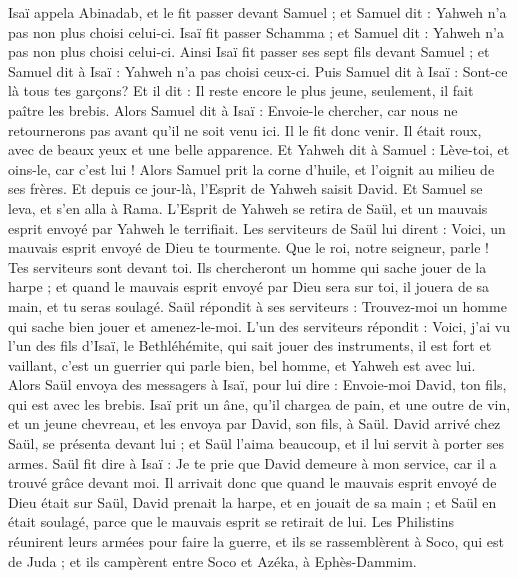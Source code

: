 \begin{multicols}{2}
Isaï appela Abinadab, et le fit passer devant Samuel ; et Samuel dit : Yahweh n'a pas non plus choisi celui-ci.
Isaï fit passer Schamma ; et Samuel dit : Yahweh n'a pas non plus choisi celui-ci.
Ainsi Isaï fit passer ses sept fils devant Samuel ; et Samuel dit à Isaï : Yahweh n'a pas choisi ceux-ci.
Puis Samuel dit à Isaï : Sont-ce là tous tes garçons? Et il dit : Il reste encore le plus jeune, seulement, il fait paître les brebis. Alors Samuel dit à Isaï : Envoie-le chercher, car nous ne retournerons pas avant qu'il ne soit venu ici.
Il le fit donc venir. Il était roux, avec de beaux yeux et une belle apparence. Et Yahweh dit à Samuel : Lève-toi, et oins-le, car c'est lui !
Alors Samuel prit la corne d'huile, et l'oignit au milieu de ses frères. Et depuis ce jour-là, l'Esprit de Yahweh saisit David. Et Samuel se leva, et s'en alla à Rama.
L'Esprit de Yahweh se retira de Saül, et un mauvais esprit envoyé par Yahweh le terrifiait.
Les serviteurs de Saül lui dirent : Voici, un mauvais esprit envoyé de Dieu te tourmente.
Que le roi, notre seigneur, parle ! Tes serviteurs sont devant toi. Ils chercheront un homme qui sache jouer de la harpe ; et quand le mauvais esprit envoyé par Dieu sera sur toi, il jouera de sa main, et tu seras soulagé.
Saül répondit à ses serviteurs : Trouvez-moi un homme qui sache bien jouer et amenez-le-moi.
L'un des serviteurs répondit : Voici, j'ai vu l'un des fils d'Isaï, le Bethléhémite, qui sait jouer des instruments, il est fort et vaillant, c'est un guerrier qui parle bien, bel homme, et Yahweh est avec lui.
Alors Saül envoya des messagers à Isaï, pour lui dire : Envoie-moi David, ton fils, qui est avec les brebis.
Isaï prit un âne, qu'il chargea de pain, et une outre de vin, et un jeune chevreau, et les envoya par David, son fils, à Saül.
David arrivé chez Saül, se présenta devant lui ; et Saül l'aima beaucoup, et il lui servit à porter ses armes.
Saül fit dire à Isaï : Je te prie que David demeure à mon service, car il a trouvé grâce devant moi.
Il arrivait donc que quand le mauvais esprit envoyé de Dieu était sur Saül, David prenait la harpe, et en jouait de sa main ; et Saül en était soulagé, parce que le mauvais esprit se retirait de lui.
\VerseOne{}Les Philistins réunirent leurs armées pour faire la guerre, et ils se rassemblèrent à Soco, qui est de Juda ; et ils campèrent entre Soco et Azéka, à Ephès-Dammim.

\end{multicols}
